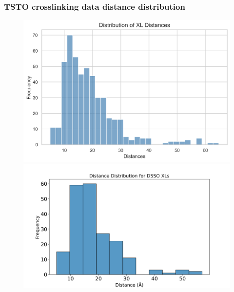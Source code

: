 \documentclass[a4paper,8pt]{beamer}
\begin{document}
\begin{frame}
  \frametitle{TSTO crosslinking data distance distribution}
  \begin{figure}
    \centering
    \includegraphics[scale=0.3]{test-figures/distance_histogram.png}
    \includegraphics[scale=0.2]{test-figures/dsso_distances.png}
  \end{figure}
  \end{frame}
%  
%
\end{document}
